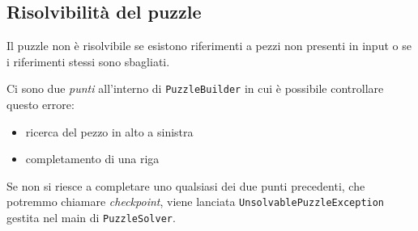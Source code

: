 \documentclass[a4paper, 12pt]{article}
\begin{document}
    \subsection{Risolvibilità del puzzle}

      Il puzzle non è risolvibile se esistono riferimenti a pezzi non presenti in input o se i riferimenti stessi sono sbagliati.

      Ci sono due \emph{punti} all'interno di \verb|PuzzleBuilder| in cui è possibile controllare questo errore:

      \begin{itemize}

        \item ricerca del pezzo in alto a sinistra
        \item completamento di una riga

      \end{itemize}

      Se non si riesce a completare uno qualsiasi dei due punti precedenti, che potremmo chiamare \emph{checkpoint}, viene lanciata \verb|UnsolvablePuzzleException| gestita nel main di \verb|PuzzleSolver|.
\end{document}
